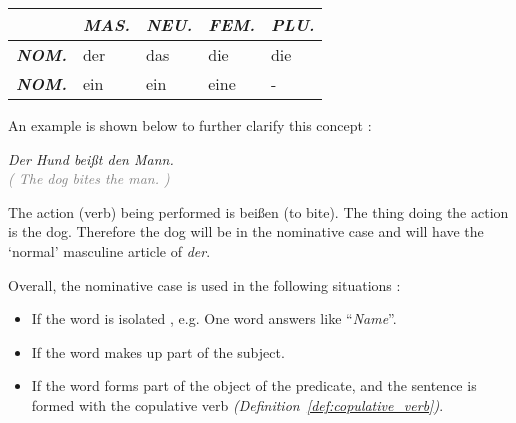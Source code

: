 \documentclass[a4paper,twocolumn,10pt]{article}
\newcommand{\newpar}
{\par \vspace{0.3cm}}
\begin{document}
\begin{tabularx}{0.94\linewidth}{l|XXXX}

		&
		\cellcolor{lightgray} \textbf{\textit{MAS.}} &
		\cellcolor{lightgray} \textbf{\textit{NEU.}}  &
		\cellcolor{lightgray} \textbf{\textit{FEM.}}  &
		\cellcolor{lightgray} \textbf{\textit{PLU.}} \\
		\midrule

		\cellcolor{lightgray} \textbf{\textit{NOM.}} &
		\cellcolor{cell-lightpurple}  der            &
		\cellcolor{cell-lightorange}  das            &
		\cellcolor{cell-lightblue} die               &
		\cellcolor{cell-lightblue} die \\

		\midrule

		\cellcolor{lightgray} \textbf{\textit{NOM.}} &
		\cellcolor{cell-lightpurple}  ein            &
		\cellcolor{cell-lightorange}  ein            &
		\cellcolor{cell-lightblue} eine              &
		\cellcolor{table-bg} - \\

\end{tabularx}

\vspace{0.5cm}

\linenumbers

An example is shown below to further clarify this concept :\newpar

\noindent
\textit{Der Hund beißt den Mann.}\\
\textcolor{gray} { \textit{( The dog bites the man. )} } \newpar

The action (verb) being performed is beißen (to bite). The thing doing the
action is the dog. Therefore the dog will be in the nominative case and will
have the ‘normal’ masculine article of \textit{der}.\newpar

Overall, the nominative case is used in the following situations :\newpar

\nolinenumbers
\begin{itemize}[noitemsep]
	\item If the word is isolated , e.g. One word answers like
		``{\textit{Name}}''.
	\item If the word makes up part of the subject.
	\item If the word forms part of the object of the predicate, and the
			sentence is formed with the copulative verb
			\textit{(Definition~\ref{def:copulative_verb})}. 
\end{itemize}
\linenumbers
\end{document}
